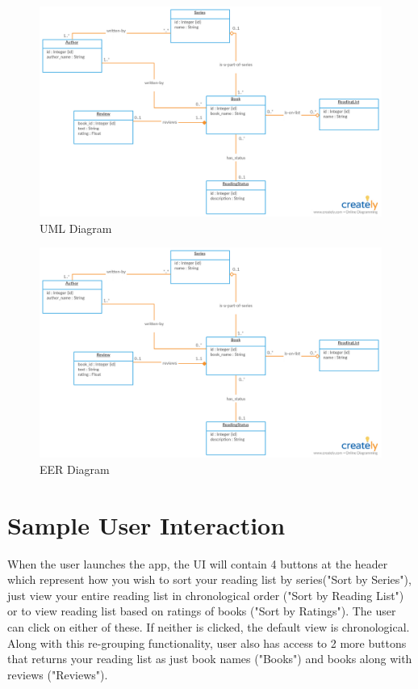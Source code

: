 \documentclass{article}
\begin{document}
\begin{figure}[h]
  \centering
  \includegraphics[width=\textwidth]{uml}
  \caption{UML Diagram}
\end{figure}

\begin{figure}[h]
  \centering
  \includegraphics[width=\textwidth]{uml}
  \caption{EER Diagram}
\end{figure}

\section*{Sample User Interaction}

When the user launches the app, the UI will contain 4 buttons at the header which 
represent how you wish to sort your reading list by series("Sort by Series"), just 
view your entire reading list in chronological order ("Sort by Reading List") or 
to view reading list based on ratings of books ("Sort by Ratings"). The user can 
click on either of these. If neither is clicked, the default view is chronological. 
Along with this re-grouping functionality, user also has access to 2 more buttons 
that returns your reading list as just book names ("Books") and books along with 
reviews ("Reviews").
\end{document}
